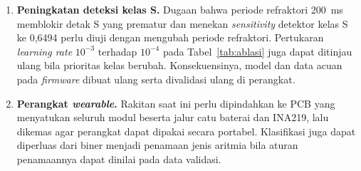 \begin{enumerate}
  \item \textbf{Peningkatan deteksi kelas S.} Dugaan bahwa periode refraktori 200~ms memblokir detak S yang prematur dan menekan \textit{sensitivity} detektor kelas S ke 0,6494 perlu diuji dengan mengubah periode refraktori. Pertukaran \textit{learning rate} $10^{-3}$ terhadap $10^{-4}$ pada Tabel~\ref{tab:ablasi} juga dapat ditinjau ulang bila prioritas kelas berubah. Konsekuensinya, model dan data acuan pada \textit{firmware} dibuat ulang serta divalidasi ulang di perangkat.
  \item \textbf{Perangkat \textit{wearable}.} Rakitan saat ini perlu dipindahkan ke PCB yang menyatukan seluruh modul beserta jalur catu baterai dan INA219, lalu dikemas agar perangkat dapat dipakai secara portabel. Klasifikasi juga dapat diperluas dari biner menjadi penamaan jenis aritmia bila aturan penamaannya dapat dinilai pada data validasi.
\end{enumerate}
